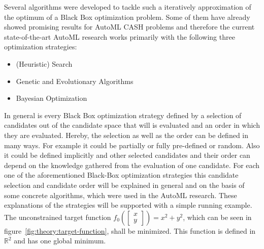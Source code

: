 Several algorithms were developed to tackle such a iteratively approximation of the optimum of a Black Box optimization problem.
Some of them have already showed promising results for AutoML CASH problems and therefore the current state-of-the-art AutoML research works primarily with the following three optimization strategies:
\begin{itemize}
    \item (Heuristic) Search
    \item Genetic and Evolutionary Algorithms
    \item Bayesian Optimization
\end{itemize}
In general is every Black Box optimization strategy defined by a selection of candidates out of the candidate space that will is evaluated and an order in which they are evaluated.
Hereby, the selection as well as the order can be defined in many ways.
For example it could be partially or fully pre-defined or random.
Also it could be defined implicitly and other selected candidates and their order can depend on the knowledge gathered from the evaluation of one candidate.\newline
For each one of the aforementioned Black-Box optimization strategies this candidate selection and candidate order will be explained in general and on the basis of some concrete algorithms, which were used in the AutoML research.
These explanations of the strategies will be supported with a simple running example.
The unconstrained target function $f_0 \left( \begin{bmatrix}x\\y \end{bmatrix} \right) = x^2 + y^2$, which can be seen in figure~\ref{fig:theory:target-function}, shall be minimized.
This function is defined in $\mathbb{R}^2$ and has one global minimum.

